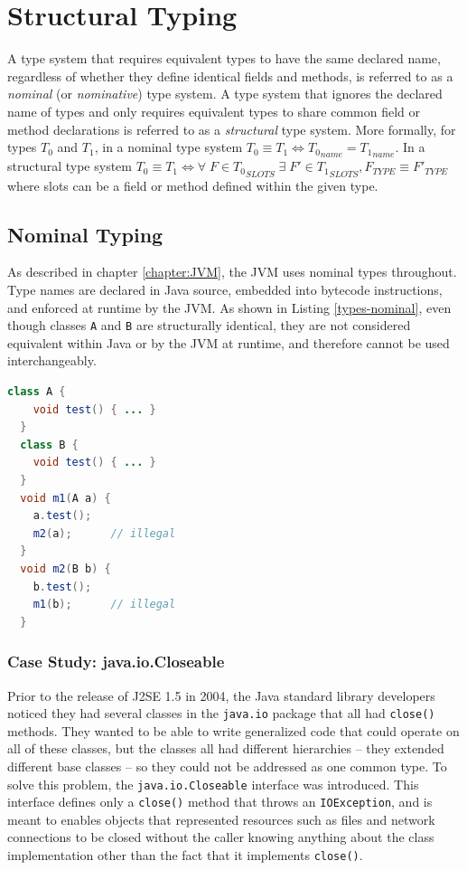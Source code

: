 \chapter{Structural Typing}
\label{chapter:StructuralTyping}
\lhead{ \leftmark }

A type system that requires equivalent types to have the same declared name, regardless of whether they define identical fields and methods, is referred to as a \emph{nominal} (or \emph{nominative}) type system.  A type system that ignores the declared name of types and only requires equivalent types to share common field or method declarations is referred to as a \emph{structural} type system.  More formally, for types $T_0$ and $T_1$, in a nominal type system $T_0 \equiv T_1 \iff {T_0}_{name} = {T_1}_{name}$. In a structural type system $T_0 \equiv T_1 \iff \forall \; F \in {T_0}_{SLOTS} \; \exists \; F' \in {T_1}_{SLOTS}, F_{TYPE} \equiv {F'}_{TYPE} $ where slots can be a field or method defined within the given type.

\section{Nominal Typing}

As described in chapter \ref{chapter:JVM}, the JVM uses nominal types throughout.  Type names are declared in Java source, embedded into bytecode instructions, and enforced at runtime by the JVM.  As shown in Listing \ref{types-nominal}, even though classes \texttt{A} and \texttt{B} are structurally identical, they are not considered equivalent within Java or by the JVM at runtime, and therefore cannot be used interchangeably.

\begin{lstlisting}[language=Java,caption=Nominal types,label=types-nominal]
  class A {
    void test() { ... }
  }
  class B {
    void test() { ... }
  }
  void m1(A a) {
    a.test();
    m2(a);      // illegal
  }
  void m2(B b) {
    b.test();
    m1(b);      // illegal
  }
\end{lstlisting}


\subsection{Case Study: java.io.Closeable}

Prior to the release of J2SE 1.5 in 2004, the Java standard library developers noticed they had several classes in the \texttt{java.io} package that all had \texttt{close()} methods.  They wanted to be able to write generalized code that could operate on all of these classes, but the classes all had different hierarchies -- they extended different base classes -- so they could not be addressed as one common type.  To solve this problem, the \texttt{java.io.Closeable} interface was introduced.  This interface defines only a \texttt{close()} method that throws an \texttt{IOException}, and is meant to enables objects that represented resources such as files and network connections to be closed without the caller knowing anything about the class implementation other than the fact that it implements \texttt{close()}.

